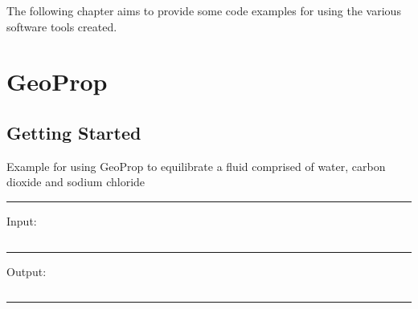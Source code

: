 The following chapter aims to provide some code examples for using the various software tools created.

\section{GeoProp}
\label{sec:geoprop_examples}
    
    \subsection{Getting Started}
    \label{sec:geoprop_example1}

        \begin{longlisting}
            \caption{Example for using GeoProp to equilibrate a fluid comprised of water, carbon dioxide and sodium chloride}
            \hrule
            \vspace{5pt}Input:\vspace{-10pt}
            \inputminted[bgcolor=bg,linenos, fontsize=\footnotesize]{python}{Content/Appendices/Appendix_D/Code/GeoPropExample.py}
            \hrule
            \vspace{5pt}Output:\vspace{-10pt}
            \inputminted[bgcolor=bg,fontsize=\scriptsize]{text}{Content/Appendices/Appendix_D/Code/GeoPropExample_Output.txt}
            \hrule
            \label{lst:geoprop_example1}
        \end{longlisting}
        
    